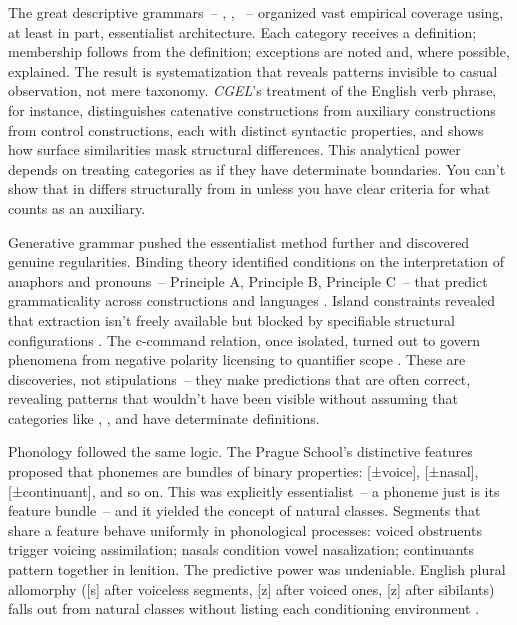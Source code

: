 The great descriptive grammars~-- \textcite{jespersen1909modern}, \textcite{quirk1985}, \textcite{huddleston2002}~-- organized vast empirical coverage using, at least in part, essentialist architecture. Each category receives a definition; membership follows from the definition; exceptions are noted and, where possible, explained. The result is systematization that reveals patterns invisible to casual observation, not mere taxonomy. \textit{CGEL}'s treatment of the English verb phrase, for instance, distinguishes catenative constructions from auxiliary constructions from control constructions, each with distinct syntactic properties, and shows how surface similarities mask structural differences. This analytical power depends on treating categories as if they have determinate boundaries. You can't show that  in  differs structurally from  in  unless you have clear criteria for what counts as an auxiliary.

Generative grammar pushed the essentialist method further and discovered genuine regularities. Binding theory identified conditions on the interpretation of anaphors and pronouns~-- Principle A, Principle B, Principle C~-- that predict grammaticality across constructions and languages \autocite{chomsky1981}. Island constraints revealed that extraction isn't freely available but blocked by specifiable structural configurations \autocite{ross1967}. The c-command relation, once isolated, turned out to govern phenomena from negative polarity licensing to quantifier scope \autocite{reinhart1983,ladusaw1979}. These are discoveries, not stipulations~-- they make predictions that are often correct, revealing patterns that wouldn't have been visible without assuming that categories like , , and  have determinate definitions.

Phonology followed the same logic. The Prague School's distinctive features \autocite{jakobson1956fundamentals} proposed that phonemes are bundles of binary properties: [±voice], [±nasal], [±continuant], and so on. This was explicitly essentialist~-- a phoneme just is its feature bundle~-- and it yielded the concept of natural classes. Segments that share a feature behave uniformly in phonological processes: voiced obstruents trigger voicing assimilation; nasals condition vowel nasalization; continuants pattern together in lenition. The predictive power was undeniable. English plural allomorphy ([s] after voiceless segments, [z] after voiced ones, [z] after sibilants) falls out from natural classes without listing each conditioning environment \autocite{hayes2009introductory}.

